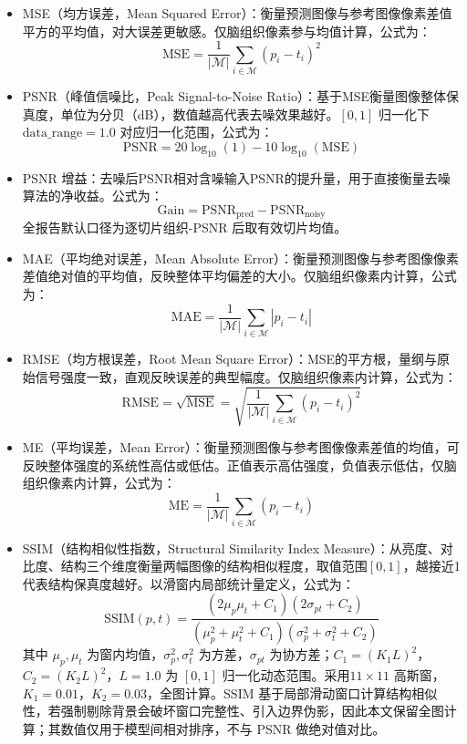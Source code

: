 \documentclass[UTF8,a4paper,12pt]{ctexart}
\begin{document}
\begin{itemize}
  \item MSE（均方误差，Mean Squared Error）：衡量预测图像与参考图像像素差值平方的平均值，对大误差更敏感。仅脑组织像素参与均值计算，公式为：
  $$\mathrm{MSE} = \frac{1}{|\mathcal{M}|}\sum_{i\in\mathcal{M}} (p_i - t_i)^2$$
  \item PSNR（峰值信噪比，Peak Signal-to-Noise Ratio）：基于MSE衡量图像整体保真度，单位为分贝（dB），数值越高代表去噪效果越好。$[0,1]$ 归一化下 $\text{data\_range}=1.0$ 对应归一化范围，公式为：
  $$\mathrm{PSNR} = 20\log_{10}(1) - 10\log_{10}(\mathrm{MSE})$$
  \item PSNR 增益：去噪后PSNR相对含噪输入PSNR的提升量，用于直接衡量去噪算法的净收益。公式为：
  $$\mathrm{Gain} = \mathrm{PSNR}_{\mathrm{pred}} - \mathrm{PSNR}_{\mathrm{noisy}}$$
  全报告默认口径为逐切片组织-PSNR 后取有效切片均值。
  \item MAE（平均绝对误差，Mean Absolute Error）：衡量预测图像与参考图像像素差值绝对值的平均值，反映整体平均偏差的大小。仅脑组织像素内计算，公式为：
  $$\mathrm{MAE} = \frac{1}{|\mathcal{M}|}\sum_{i\in\mathcal{M}} |p_i - t_i|$$
  \item RMSE（均方根误差，Root Mean Square Error）：MSE的平方根，量纲与原始信号强度一致，直观反映误差的典型幅度。仅脑组织像素内计算，公式为：
  $$\mathrm{RMSE} = \sqrt{\mathrm{MSE}} = \sqrt{\frac{1}{|\mathcal{M}|}\sum_{i\in\mathcal{M}} (p_i - t_i)^2}$$
  \item ME（平均误差，Mean Error）：衡量预测图像与参考图像像素差值的均值，可反映整体强度的系统性高估或低估。正值表示高估强度，负值表示低估，仅脑组织像素内计算，公式为：
  $$\mathrm{ME} = \frac{1}{|\mathcal{M}|}\sum_{i\in\mathcal{M}} (p_i - t_i)$$
  \item SSIM（结构相似性指数，Structural Similarity Index Measure）：从亮度、对比度、结构三个维度衡量两幅图像的结构相似程度，取值范围$[0,1]$，越接近1代表结构保真度越好。以滑窗内局部统计量定义，公式为：
  $$\mathrm{SSIM}(p,t) = \frac{(2\mu_p\mu_t + C_1)(2\sigma_{pt} + C_2)}{(\mu_p^2 + \mu_t^2 + C_1)(\sigma_p^2 + \sigma_t^2 + C_2)}$$
  其中 $\mu_p,\mu_t$ 为窗内均值，$\sigma_p^2,\sigma_t^2$ 为方差，$\sigma_{pt}$ 为协方差；$C_1=(K_1 L)^2$，$C_2=(K_2 L)^2$，$L=1.0$ 为 $[0,1]$ 归一化动态范围。采用$11\times 11$ 高斯窗，$K_1=0.01$，$K_2=0.03$，全图计算。SSIM 基于局部滑动窗口计算结构相似性，若强制剔除背景会破坏窗口完整性、引入边界伪影，因此本文保留全图计算；其数值仅用于模型间相对排序，不与 PSNR 做绝对值对比。
\end{itemize}
\end{document}
